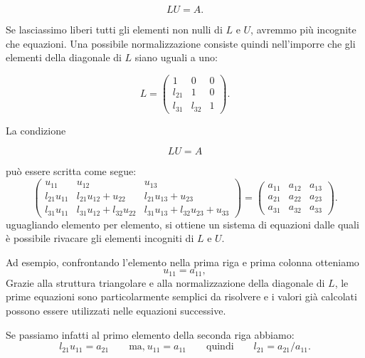 \begin{equation*}
    LU=A.
\end{equation*}

Se lasciassimo liberi tutti gli elementi non nulli di $L$ e $U$,
avremmo più incognite che equazioni. Una possibile normalizzazione
consiste quindi nell'imporre che gli elementi della diagonale di
$L$ siano uguali a uno:

\begin{equation*}
L=
\begin{pmatrix}
    1      & 0 & 0\\
    l_{21} & 1 & 0\\
    l_{31} & l_{32} & 1
\end{pmatrix}.
\end{equation*}

La condizione

\begin{equation*}
    LU=A
\end{equation*}

può essere scritta come segue:
\[
\begin{pmatrix}
u_{11} &
u_{12} &
u_{13}\\
l_{21}u_{11} &
l_{21}u_{12}+u_{22} &
l_{21}u_{13}+u_{23}\\
l_{31}u_{11} &
l_{31}u_{12}+l_{32}u_{22} &
l_{31}u_{13}+l_{32}u_{23}+u_{33}
\end{pmatrix}
=
\begin{pmatrix}
a_{11} & a_{12} & a_{13}\\
a_{21} & a_{22} & a_{23}\\
a_{31} & a_{32} & a_{33}
\end{pmatrix}.
\]
uguagliando elemento per elemento, si ottiene un sistema di equazioni dalle quali è possibile rivacare gli elementi incogniti di $L$ e $U$.

Ad esempio, confrontando l'elemento nella prima riga e prima
colonna otteniamo
\begin{equation*}
    u_{11}=a_{11},
\end{equation*}
Grazie alla struttura triangolare e alla normalizzazione della
diagonale di $L$, le prime equazioni sono particolarmente semplici
da risolvere e i valori già calcolati possono essere utilizzati
nelle equazioni successive.

Se passiamo infatti al primo elemento della seconda riga abbiamo:
\[
	l_{21}u_{11}=a_{21}\qquad\text{ma,}\ u_{11}=a_{11}\qquad \text{quindi}\qquad l_{21}=a_{21}/a_{11}.
\]

